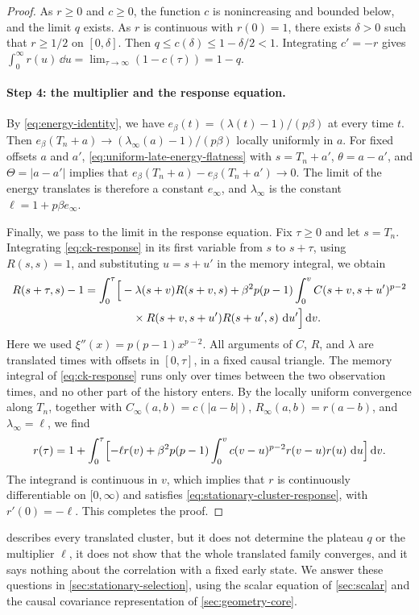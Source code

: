 \begin{proof}
As $r\ge0$ and $c\ge0$, the function $c$ is nonincreasing and bounded below, and the limit $q$ exists. As $r$ is continuous with $r(0)=1$, there exists $\delta>0$ such that $r\ge1/2$ on $[0,\delta]$. Then $q\le c(\delta)\le1-\delta/2<1$. Integrating $c'=-r$ gives $\int_0^\infty r(u)\,\dd u=\lim_{\tau\to\infty}(1-c(\tau))=1-q$.

\paragraph{Step 4: the multiplier and the response equation.}
By \eqref{eq:energy-identity}, we have $e_\beta(t)=(\lambda(t)-1)/(p\beta)$ at every time $t$. Then $e_\beta(T_n+a)\to(\lambda_\infty(a)-1)/(p\beta)$ locally uniformly in $a$. For fixed offsets $a$ and $a'$, \eqref{eq:uniform-late-energy-flatness} with $s=T_n+a'$, $\theta=a-a'$, and $\Theta=|a-a'|$ implies that $e_\beta(T_n+a)-e_\beta(T_n+a')\to0$. The limit of the energy translates is therefore a constant $e_\infty$, and $\lambda_\infty$ is the constant $\ell=1+p\beta e_\infty$.

Finally, we pass to the limit in the response equation. Fix $\tau\ge0$ and let $s=T_n$. Integrating \eqref{eq:ck-response} in its first variable from $s$ to $s+\tau$, using $R(s,s)=1$, and substituting $u=s+u'$ in the memory integral, we obtain
\[
\begin{aligned}
 R(s+\tau,s)-1=\int_0^\tau\Bigl[&-\lambda(s+v)R(s+v,s)
 +\beta^2p(p-1)\int_0^vC(s+v,s+u')^{p-2}\\
 &\quad\times R(s+v,s+u')R(s+u',s)\,\mathop{}\!\mathrm d u'\Bigr]\mathop{}\!\mathrm d v.
\end{aligned}
\]
Here we used $\xi''(x)=p(p-1)x^{p-2}$. All arguments of $C$, $R$, and $\lambda$ are translated times with offsets in $[0,\tau]$, in a fixed causal triangle. The memory integral of \eqref{eq:ck-response} runs only over times between the two observation times, and no other part of the history enters. By the locally uniform convergence along $T_n$, together with $C_\infty(a,b)=c(|a-b|)$, $R_\infty(a,b)=r(a-b)$, and $\lambda_\infty=\ell$, we find
\[
 r(\tau)=1+\int_0^\tau\Bigl[-\ell r(v)+\beta^2p(p-1)\int_0^vc(v-u)^{p-2}r(v-u)r(u)\,\mathop{}\!\mathrm d u\Bigr]\mathop{}\!\mathrm d v.
\]
The integrand is continuous in $v$, which implies that $r$ is continuously differentiable on $[0,\infty)$ and satisfies \eqref{eq:stationary-cluster-response}, with $r'(0)=-\ell$. This completes the proof.
\end{proof}

 describes every translated cluster, but it does not determine the plateau $q$ or the multiplier $\ell$, it does not show that the whole translated family converges, and it says nothing about the correlation with a fixed early state. We answer these questions in \cref{sec:stationary-selection}, using the scalar equation of \cref{sec:scalar} and the causal covariance representation of \cref{sec:geometry-core}.
